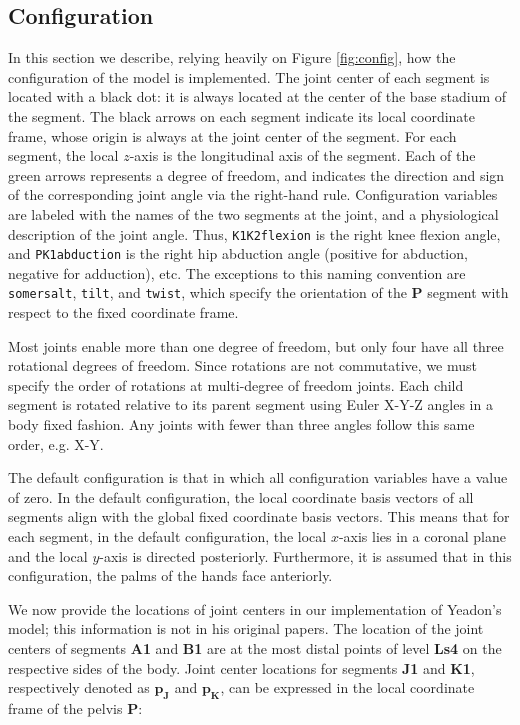 \documentclass[10pt,a4paper,twocolumn]{article}
\begin{document}
\subsection*{Configuration}

In this section we describe, relying heavily on Figure \ref{fig:config}, how
the configuration of the model is implemented. The joint center of each segment
is located with a black dot: it is always located at the center of the base
stadium of the segment. The black arrows on each segment indicate its local
coordinate frame, whose origin is always at the joint center of the segment.
For each segment, the local $z$-axis is the longitudinal axis of the segment.
Each of the green arrows represents a degree of freedom, and indicates the
direction and sign of the corresponding joint angle via the right-hand rule.
Configuration variables are labeled with the names of the two segments at the
joint, and a physiological description of the joint angle. Thus,
\verb+K1K2flexion+ is the right knee flexion angle, and \verb+PK1abduction+ is
the right hip abduction angle (positive for abduction, negative for adduction),
etc. The exceptions to this naming convention are \verb+somersalt+,
\verb+tilt+, and \verb+twist+, which specify the orientation of the \textbf{P}
segment with respect to the fixed coordinate frame.

Most joints enable more than one degree of freedom, but only four have all
three rotational degrees of freedom. Since rotations are not commutative,  we
must specify the order of rotations at multi-degree of freedom joints. Each
child segment is rotated relative to its parent segment using Euler X-Y-Z
angles in a body fixed fashion. Any joints with fewer than three angles follow
this same order, e.g. X-Y.

The default configuration is that in which all configuration variables have a
value of zero. In the default configuration, the local coordinate basis vectors
of all segments align with the global fixed coordinate basis vectors. This
means that for each segment, in the default configuration, the local $x$-axis
lies in a coronal plane and the local $y$-axis is directed posteriorly.
Furthermore, it is assumed that in this configuration, the palms of the hands
face anteriorly.

We now provide the locations of joint centers in our implementation of Yeadon's
model; this information is not in his original papers. The location of the
joint centers of segments \textbf{A1} and \textbf{B1} are at the most distal
points of level \textbf{Ls4} on the respective sides of the body. Joint center
locations for segments \textbf{J1} and \textbf{K1}, respectively denoted as
$\mathbf{p_J}$ and $\mathbf{p_K}$, can be expressed in the local coordinate
frame of the pelvis \textbf{P}:
\end{document}
